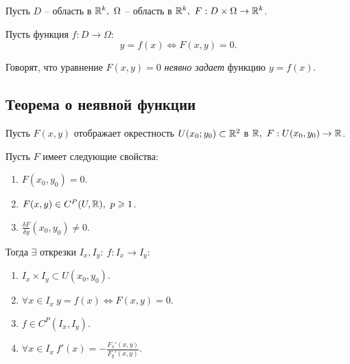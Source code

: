 \begin{definition}
    Пусть $D$ -- область в $\mathbb{R}^k, \ \Omega$ -- область в $\mathbb{R}^k, \ F: D \times \Omega \rightarrow \mathbb{R}^k $.

    Пусть функция $f:D \rightarrow\Omega:$
    \[
        y = f(x) \iff F(x,y) = 0.
    \]

    Говорят, что уравнение $F(x,y) = 0$ \emph{неявно задает} функцию $y = f(x)$.
\end{definition}

\subsection{Теорема о неявной функции}

\begin{theorem}\label{theorem:1}
    Пусть $ F(x,y) $ отображает окрестность $ U(x_0;y_0) \subset \mathbb{R}^2 $ в $ \R, \ F:U(x_0,y_0)\rightarrow\R $.

    Пусть $ F $ имеет следующие свойства:
    \begin{enumerate}
        \item $ F(x_0,y_0) = 0 $.
        \item $ F(x,y) \in C^P(U,\mathbb{R}), \ p \geqslant 1 $.
        \item $ \frac{\delta F}{\delta y}(x_0,y_0)\ne 0 $.
    \end{enumerate}

    Тогда $ \exists $ открезки $ I_x,I_y: \ f:I_x \rightarrow I_y $:
    \begin{enumerate}
        \item $ I_x \times I_y \subset U(x_0,y_0) $.
        \item $ \forall x \in I_x \ y = f(x) \iff F(x,y) = 0 $.
        \item $ f \in C^P(I_x,I_y) $.
        \item $ \forall x \in I_x \ f'(x) = -\frac{F_x'(x,y)}{F_y'(x,y)} $.
    \end{enumerate}
\end{theorem}